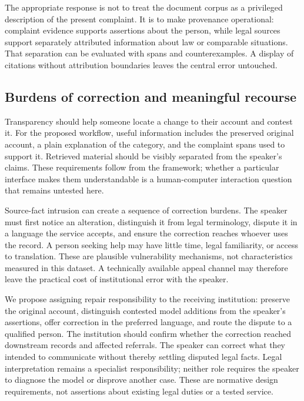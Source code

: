 \documentclass[manuscript,screen,review,anonymous]{acmart}
\begin{document}
The appropriate response is not to treat the document corpus as a privileged description of the present complaint. It is to make provenance operational: complaint evidence supports assertions about the person, while legal sources support separately attributed information about law or comparable situations. That separation can be evaluated with spans and counterexamples. A display of citations without attribution boundaries leaves the central error untouched.

\subsection{Burdens of correction and meaningful recourse}

Transparency should help someone locate a change to their account and contest it. For the proposed workflow, useful information includes the preserved original account, a plain explanation of the category, and the complaint spans used to support it. Retrieved material should be visibly separated from the speaker's claims. These requirements follow from the framework; whether a particular interface makes them understandable is a human-computer interaction question that remains untested here.

Source-fact intrusion can create a sequence of correction burdens. The speaker must first notice an alteration, distinguish it from legal terminology, dispute it in a language the service accepts, and ensure the correction reaches whoever uses the record. A person seeking help may have little time, legal familiarity, or access to translation. These are plausible vulnerability mechanisms, not characteristics measured in this dataset. A technically available appeal channel may therefore leave the practical cost of institutional error with the speaker.

We propose assigning repair responsibility to the receiving institution: preserve the original account, distinguish contested model additions from the speaker's assertions, offer correction in the preferred language, and route the dispute to a qualified person. The institution should confirm whether the correction reached downstream records and affected referrals. The speaker can correct what they intended to communicate without thereby settling disputed legal facts. Legal interpretation remains a specialist responsibility; neither role requires the speaker to diagnose the model or disprove another case. These are normative design requirements, not assertions about existing legal duties or a tested service.
\end{document}
